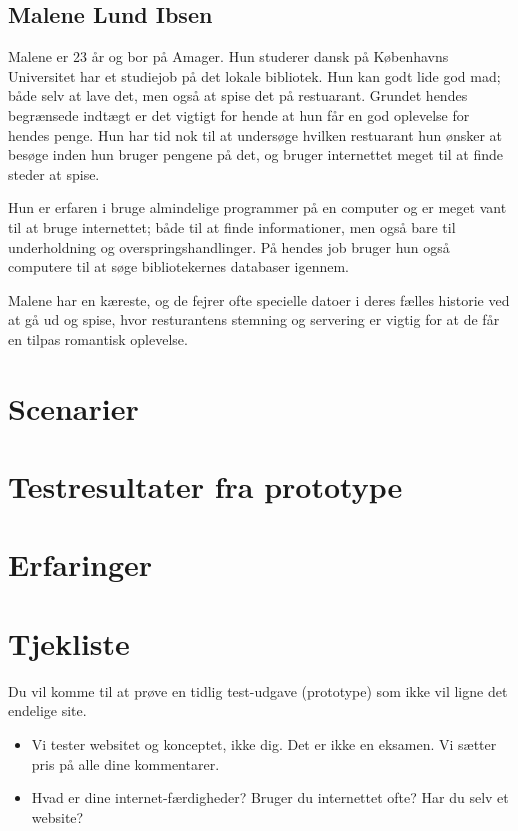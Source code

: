 \documentclass[a4paper, 12pt]{article}
\begin{document}
\subsection{Malene Lund Ibsen}
Malene er 23 år og bor på Amager. Hun studerer dansk på Københavns Universitet har et studiejob på det lokale bibliotek. Hun kan godt lide god mad; både selv at lave det, men også at spise det på restuarant. Grundet hendes begrænsede indtægt er det vigtigt for hende at hun får en god oplevelse for hendes penge. Hun har tid nok til at undersøge hvilken restuarant hun ønsker at besøge inden hun bruger pengene på det, og bruger internettet meget til at finde steder at spise.

Hun er erfaren i bruge almindelige programmer på en computer og er meget vant til at bruge internettet; både til at finde informationer, men også bare til underholdning og overspringshandlinger. På hendes job bruger hun også computere til at søge bibliotekernes databaser igennem. 

Malene har en kæreste, og de fejrer ofte specielle datoer i deres fælles historie ved at gå ud og spise, hvor resturantens stemning og servering er vigtig for at de får en tilpas romantisk oplevelse.


\section{Scenarier}
\label{sec:Scenarier}

\section{Testresultater fra prototype}
\label{sec:Testresultater fra prototype}

\section{Erfaringer}
\label{sec:Erfaringer}

\clearpage
\appendix

\section{Tjekliste}

Du vil komme til at prøve en tidlig test-udgave (prototype) som ikke vil ligne det endelige site.
\begin{itemize}
\item Vi tester websitet og konceptet, ikke dig. Det er ikke en
  eksamen. Vi sætter pris på alle dine kommentarer.
\item Hvad er dine internet-færdigheder? Bruger du internettet ofte?
  Har du selv et website?
\end{itemize}
\end{document}
